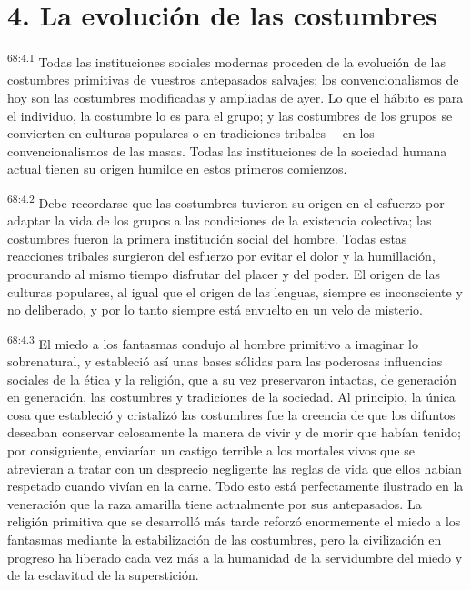 \section*{4. La evolución de las costumbres}
\par
\textsuperscript{68:4.1} Todas las instituciones sociales modernas proceden de la evolución de las costumbres primitivas de vuestros antepasados salvajes; los convencionalismos de hoy son las costumbres modificadas y ampliadas de ayer. Lo que el hábito es para el individuo, la costumbre lo es para el grupo; y las costumbres de los grupos se convierten en culturas populares o en tradiciones tribales ---en los convencionalismos de las masas. Todas las instituciones de la sociedad humana actual tienen su origen humilde en estos primeros comienzos.

\par
\textsuperscript{68:4.2} Debe recordarse que las costumbres tuvieron su origen en el esfuerzo por adaptar la vida de los grupos a las condiciones de la existencia colectiva; las costumbres fueron la primera institución social del hombre. Todas estas reacciones tribales surgieron del esfuerzo por evitar el dolor y la humillación, procurando al mismo tiempo disfrutar del placer y del poder. El origen de las culturas populares, al igual que el origen de las lenguas, siempre es inconsciente y no deliberado, y por lo tanto siempre está envuelto en un velo de misterio.

\par
\textsuperscript{68:4.3} El miedo a los fantasmas condujo al hombre primitivo a imaginar lo sobrenatural, y estableció así unas bases sólidas para las poderosas influencias sociales de la ética y la religión, que a su vez preservaron intactas, de generación en generación, las costumbres y tradiciones de la sociedad. Al principio, la única cosa que estableció y cristalizó las costumbres fue la creencia de que los difuntos deseaban conservar celosamente la manera de vivir y de morir que habían tenido; por consiguiente, enviarían un castigo terrible a los mortales vivos que se atrevieran a tratar con un desprecio negligente las reglas de vida que ellos habían respetado cuando vivían en la carne. Todo esto está perfectamente ilustrado en la veneración que la raza amarilla tiene actualmente por sus antepasados. La religión primitiva que se desarrolló más tarde reforzó enormemente el miedo a los fantasmas mediante la estabilización de las costumbres, pero la civilización en progreso ha liberado cada vez más a la humanidad de la servidumbre del miedo y de la esclavitud de la superstición.

